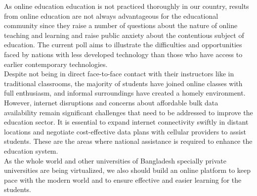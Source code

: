 As online education education is not practiced thoroughly in our country, results from online education are not always advantageous for the educational community since they raise a number of questions about the nature of online teaching and learning and raise public anxiety about the contentious subject of education. The current poll aims to illustrate the difficulties and opportunities faced by nations with less developed technology than those who have access to earlier contemporary technologies. \\

Despite not being in direct face-to-face contact with their instructors like in traditional classrooms, the majority of students have joined online classes with full enthusiasm, and informal surroundings have created a homely environment. However, internet disruptions and concerns about affordable bulk data availability remain significant challenges that need to be addressed to improve the education sector. It is essential to expand internet connectivity swiftly in distant locations and negotiate cost-effective data plans with cellular providers to assist students. These are the areas where national assistance is required to enhance the education system.\\

As the whole world and other universities of Bangladesh specially private universities are being virtualized, we also should build an online platform to keep pace with the modern world and to ensure effective and easier learning for the students.\\



